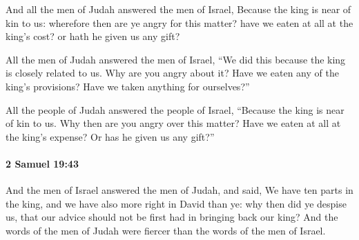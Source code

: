 			\begin{versebox}
					\item[BHS] 
					\item[ASV] And all the men of Judah answered the men of Israel, Because the king is near of kin to us: wherefore then are ye angry for this matter? have we eaten at all at the king's cost? or hath he given us any gift?
					\item[NIV] All the men of Judah answered the men of Israel, “We did this because the king is closely related to us. Why are you angry about it? Have we eaten any of the king’s provisions? Have we taken anything for ourselves?”
					\item[NRSV] All the people of Judah answered the people of Israel, “Because the king is near of kin to us. Why then are you angry over this matter? Have we eaten at all at the king’s expense? Or has he given us any gift?”
			\end{versebox}

		\paragraph{2 Samuel 19:43} %
			\label{2SAMUEL-19-43}

			And the men of Israel answered the men of Judah, and said, We have ten parts in the king, and we have also more right in David than ye: why then did ye despise us, that our advice should not be first had in bringing back our king? And the words of the men of Judah were fiercer than the words of the men of Israel.


